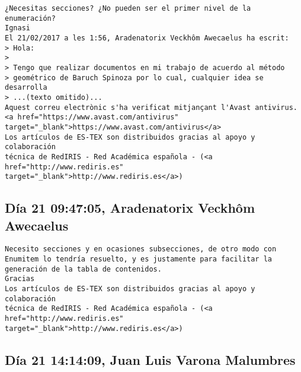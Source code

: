\documentclass[a4paper,10pt]{article}
\begin{document}
\begin{lstlisting}
¿Necesitas secciones? ¿No pueden ser el primer nivel de la enumeración?
Ignasi
El 21/02/2017 a les 1:56, Aradenatorix Veckhôm Awecaelus ha escrit:
> Hola:
>
> Tengo que realizar documentos en mi trabajo de acuerdo al método
> geométrico de Baruch Spinoza por lo cual, cualquier idea se desarrolla
> ...(texto omitido)...
Aquest correu electrònic s'ha verificat mitjançant l'Avast antivirus.
<a href="https://www.avast.com/antivirus" target="_blank">https://www.avast.com/antivirus</a>
Los artículos de ES-TEX son distribuidos gracias al apoyo y colaboración 
técnica de RedIRIS - Red Académica española - (<a href="http://www.rediris.es" target="_blank">http://www.rediris.es</a>)

\end{lstlisting}

\subsection{Día 21 09:47:05, Aradenatorix Veckhôm Awecaelus}

\begin{lstlisting}
Necesito secciones y en ocasiones subsecciones, de otro modo con
Enumitem lo tendría resuelto, y es justamente para facilitar la
generación de la tabla de contenidos.
Gracias
Los artículos de ES-TEX son distribuidos gracias al apoyo y colaboración 
técnica de RedIRIS - Red Académica española - (<a href="http://www.rediris.es" target="_blank">http://www.rediris.es</a>)

\end{lstlisting}

\subsection{Día 21 14:14:09, Juan Luis Varona Malumbres}
\end{document}

